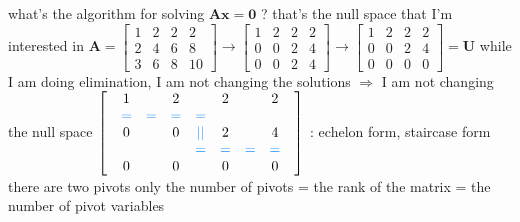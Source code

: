 \documentclass[12pt, a4paper]{article}
\begin{document}
{\noindent what's the algorithm for solving ${\mathbf{A}}{\mathbf{x}} = {\mathbf{0}}$ ?
\vspace{14pt}
\newline
that's the null space that I'm interested in
\vspace{14pt}
\newline
\begin{math}
	{\mathbf{A}} = 
	\begin{bmatrix}
		1 & 2 & 2 & 2 \\
		2 & 4 & 6 & 8 \\
		3 & 6 & 8 & 10
	\end{bmatrix}
	\longrightarrow
	\begin{bmatrix}
		1 & 2 & 2 & 2 \\
		0 & 0 & 2 & 4 \\
		0 & 0 & 2 & 4 
	\end{bmatrix}
	\longrightarrow
	\begin{bmatrix}
		1 & 2 & 2 & 2 \\
		0 & 0 & 2 & 4 \\
		0 & 0 & 0 & 0 
	\end{bmatrix}
	 = 
	{\mathbf{U}}
\end{math}
\newline
while I am doing elimination, 
\newline
I am not changing the solutions $\Longrightarrow$ I am not changing the null space
\vspace{14pt}
\newline
\begin{math}
	\begin{bmatrix}
		 & 1 &   & 2 &   & 2 &   & 2 & \\
		 & {\textcolor{anhao-sky}{=}} & {\textcolor{anhao-sky}{=}} & {\textcolor{anhao-sky}{=}} & {\textcolor{anhao-sky}{=}} &   &   &   & \\
		 & 0 &   & 0 & {\textcolor{anhao-sky}{||}} & 2 &   & 4 & \\
		 &   &   &   & {\textcolor{anhao-sky}{=}} & {\textcolor{anhao-sky}{=}} & {\textcolor{anhao-sky}{=}} & {\textcolor{anhao-sky}{=}} & \\
		 & 0 &   & 0 &   & 0 &   & 0 & 
	\end{bmatrix}
\end{math}
 : echelon form, staircase form
\newline
there are two pivots only
\vspace{14pt}
\newline
{\textcolor{anhao-scarlet}{the number of pivots = the rank of the matrix = the number of pivot variables}}
}
\end{document}
